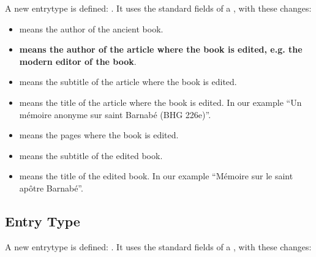 \documentclass{ltxdockit}[2011/03/25]
\begin{document}
A new entrytype is defined: . It uses the standard fields of a , with these changes:

\begin{itemize}
	\item {} means the author of the ancient book.
	\item \textbf{ means the author of the article where the book is edited, e.g. the modern editor of the book}.
	\item {} means the subtitle of the article where the book is edited.
	\item {} means the title of the article where the book is edited. In our example \enquote{Un mémoire anonyme sur saint Barnabé (BHG 226e)}.
	\item {} means the pages where the book is edited.
	\item {} means the subtitle of the edited book.
	\item {} means the title of the edited book. In our example \enquote{Mémoire sur le saint apôtre Barnabé}.


\end{itemize}


\subsection{ Entry Type}

A new entrytype is defined: . It uses the standard fields of a , with these changes:
\end{document}
